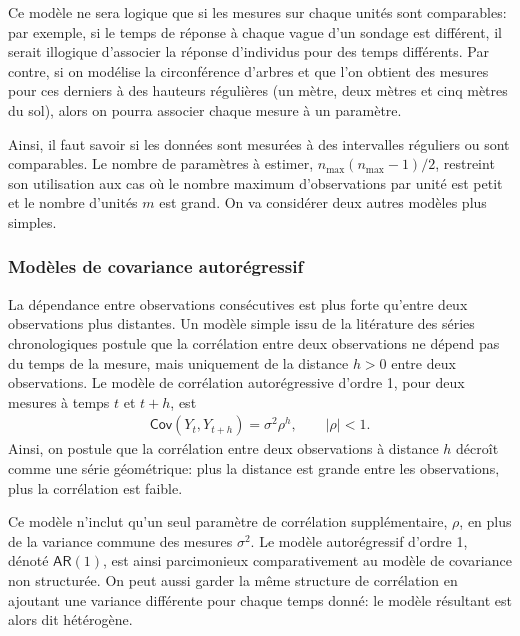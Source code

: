 \documentclass[
  11pt,
  letterpaper,
]{article}
\theoremstyle{definition}
\theoremstyle{definition}
\theoremstyle{definition}
\theoremstyle{definition}
\theoremstyle{remark}
\begin{document}
Ce modèle ne sera logique que si les mesures sur chaque unités sont comparables: par exemple, si le temps de réponse à chaque vague d'un sondage est différent, il serait illogique d'associer la réponse d'individus pour des temps différents. Par contre, si on modélise la circonférence d'arbres et que l'on obtient des mesures pour ces derniers à des hauteurs régulières (un mètre, deux mètres et cinq mètres du sol), alors on pourra associer chaque mesure à un paramètre.

Ainsi, il faut savoir si les données sont mesurées à des intervalles réguliers ou sont comparables. Le nombre de paramètres à estimer, \(n_{\max} (n_{\max} − 1)/2\), restreint son utilisation aux cas
où le nombre maximum d'observations par unité est petit et le nombre d'unités \(m\) est grand. On va considérer deux autres modèles plus simples.

\hypertarget{moduxe8les-de-covariance-autoruxe9gressif}{%
\subsubsection{Modèles de covariance autorégressif}\label{moduxe8les-de-covariance-autoruxe9gressif}}

La dépendance entre observations consécutives est plus forte qu'entre deux observations plus distantes. Un modèle simple issu de la litérature des séries chronologiques postule que la corrélation entre deux observations ne dépend pas du temps de la mesure, mais uniquement de la distance \(h>0\) entre deux observations. Le modèle de corrélation autorégressive d'ordre 1, pour deux mesures à temps \(t\) et \(t+h\), est
\begin{align*}
\mathsf{Cov}(Y_{t}, Y_{t+h}) = \sigma^2\rho^h, \qquad  |\rho| < 1.
\end{align*}
Ainsi, on postule que la corrélation entre deux observations à distance \(h\) décroît comme une série géométrique: plus la distance est grande entre les observations, plus la corrélation est faible.

Ce modèle n'inclut qu'un seul paramètre de corrélation supplémentaire, \(\rho\), en plus de la variance commune des mesures \(\sigma^2\). Le modèle autorégressif d'ordre 1, dénoté \(\mathsf{AR}(1)\), est ainsi parcimonieux comparativement au modèle de covariance non structurée. On peut aussi garder la même structure de corrélation en ajoutant une variance différente pour chaque temps donné: le modèle résultant est alors dit hétérogène.
\end{document}
